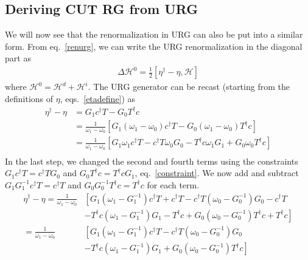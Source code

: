 \subsection{Deriving CUT RG from URG}
We will now see that the renormalization in URG can also be put into a similar form. From eq.~\ref{renurg}, we can write the URG renormalization in the diagonal part as
\begin{equation}\begin{aligned}
	\Delta \mathcal{H}^0 = \frac{1}{2}\left[\eta^\dagger - \eta,\mathcal{H}\right]
\end{aligned}\end{equation}
where \(\mathcal{H}^0 = \mathcal{H}^d + \mathcal{H}^i\). The URG generator can be recast (starting from the definitions of \(\eta\), eqs.~\ref{etadefine}) as
\begin{equation}\begin{aligned}
\eta^\dagger - \eta &= G_1 c^\dagger T - G_0 T^\dagger c\\
		    &= \frac{1}{\omega_1 - \omega_0}\left[G_1 \left(\omega_1 - \omega_0\right)c^\dagger T - G_0 \left(\omega_1 - \omega_0\right)T^\dagger c\right]\\
		    &= \frac{1}{\omega_1 - \omega_0}\left[G_1 \omega_1 c^\dagger T - c^\dagger T\omega_0G_0 - T^\dagger c \omega_1 G_1 +  G_0\omega_0T^\dagger c\right]\\
\end{aligned}\end{equation}
In the last step, we changed the second and fourth terms using the constraints \(G_1 c^\dagger T = c^\dagger T G_0\) and \(G_0 T^\dagger c = T^\dagger c G_1\), eq.~\ref{constraint}. We now add and subtract \(G_1 G_1^{-1}c^\dagger T = c^\dagger T\) and \(G_0 G_0^{-1}T^\dagger c = T^\dagger c\) for each term.
\begin{equation}\begin{aligned}
	\eta^\dagger - \eta = \frac{1}{\omega_1 - \omega_0}&\left[G_1 \left(\omega_1 - G_1^{-1}\right)c^\dagger T + c^\dagger T - c^\dagger T \left(\omega_0 - G_0^{-1}\right) G_0 - c^\dagger T \right.\\
							   &\left.-  T^\dagger c\left(\omega_1 - G_1^{-1}\right)G_1 - T^\dagger c +  G_0\left(\omega_0 - G_0^{-1}\right)T^\dagger c + T^\dagger c\right]\\
	= \frac{1}{\omega_1 - \omega_0}&\left[G_1 \left(\omega_1 - G_1^{-1}\right)c^\dagger T - c^\dagger T \left(\omega_0 - G_0^{-1}\right) G_0 \right.\\
				       &\left.-  T^\dagger c\left(\omega_1 - G_1^{-1}\right)G_1 +  G_0\left(\omega_0 - G_0^{-1}\right)T^\dagger c\right]\\
\end{aligned}\end{equation}
